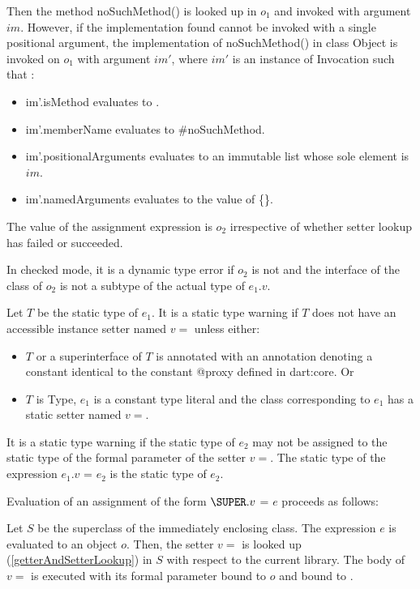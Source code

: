 \documentclass{article}
\newcommand{\code}[1]{{\sf #1}}
\begin{document}
\LMHash{}
Then the method \code{noSuchMethod()} is looked up in $o_1$ and invoked  with argument $im$. 
However, if the implementation found cannot be invoked with a single positional argument, the implementation  of \code{noSuchMethod()} in class \code{Object} is invoked on $o_1$ with argument $im'$, where $im'$ is an instance of \code{Invocation} such that :
\begin{itemize}
\item  \code{im'.isMethod} evaluates to \code{\TRUE{}}.
\item  \code{im'.memberName} evaluates to \code{\#noSuchMethod}.
\item \code{im'.positionalArguments} evaluates to an immutable list whose sole element is  $im$.
\item \code{im'.namedArguments} evaluates to the value of \code{\CONST{} \{\}}.
\end{itemize}

\LMHash{}
The value of the assignment expression is $o_2$ irrespective of whether setter lookup has failed or succeeded.

\LMHash{}
In checked mode, it is a dynamic type error if $o_2$ is not \NULL{} and the interface of the class of $o_2$ is not a subtype of the actual type of $e_1.v$.

\LMHash{}
Let $T$ be the static type of $e_1$. It is a static type warning if $T$ does not have an accessible instance setter named $v=$ unless either:
\begin{itemize}
\item $T$ or a superinterface of $T$ is annotated with an annotation denoting a constant identical to the constant \code{@proxy} defined in \code{dart:core}. Or
\item $T$ is \code{Type}, $e_1$ is a constant type literal and the class corresponding to $e_1$ has a static setter named $v=$. 
\end{itemize}



\LMHash{}
It is a static type warning if the static type of $e_2$ may not be assigned to the static type of the formal parameter of the setter $v=$.   The static type of the expression $e_1.v$ \code{=} $e_2$ is the static type of $e_2$.

\LMHash{}
Evaluation of an assignment of the form $\SUPER.v$ \code{=} $e$ proceeds as follows:

\LMHash{}
Let $S$ be the superclass of the immediately enclosing class.
The expression $e$ is evaluated to an object $o$.  Then, the setter $v=$ is looked up (\ref{getterAndSetterLookup}) in $S$ with respect to the current library.  The body  of $v=$ is executed with its formal parameter bound to $o$ and \THIS{} bound to \THIS{}. 
\end{document}
